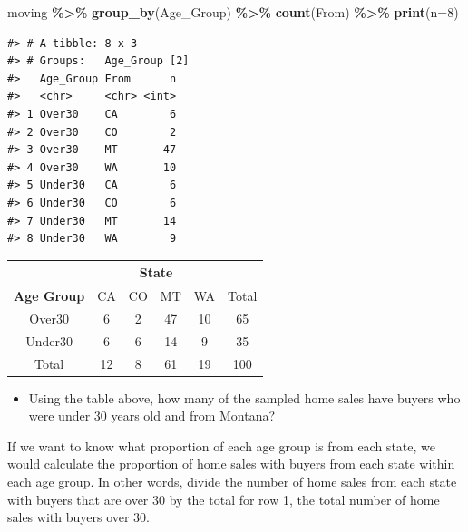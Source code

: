 \documentclass[
]{report}
\newenvironment{Shaded}{\begin{snugshade}}{\end{snugshade}}
\newcommand{\AttributeTok}[1]{\textcolor[rgb]{0.13,0.29,0.53}{#1}}
\newcommand{\DecValTok}[1]{\textcolor[rgb]{0.00,0.00,0.81}{#1}}
\newcommand{\FunctionTok}[1]{\textcolor[rgb]{0.13,0.29,0.53}{\textbf{#1}}}
\newcommand{\NormalTok}[1]{#1}
\newcommand{\SpecialCharTok}[1]{\textcolor[rgb]{0.81,0.36,0.00}{\textbf{#1}}}
\providecommand{\tightlist}{%
  \setlength{\itemsep}{0pt}\setlength{\parskip}{0pt}}
\begin{document}
\begin{Shaded}
\begin{Highlighting}[]
\NormalTok{moving }\SpecialCharTok{\%\textgreater{}\%}
    \FunctionTok{group\_by}\NormalTok{(Age\_Group) }\SpecialCharTok{\%\textgreater{}\%} \FunctionTok{count}\NormalTok{(From) }\SpecialCharTok{\%\textgreater{}\%} \FunctionTok{print}\NormalTok{(}\AttributeTok{n=}\DecValTok{8}\NormalTok{)}
\end{Highlighting}
\end{Shaded}

\begin{verbatim}
#> # A tibble: 8 x 3
#> # Groups:   Age_Group [2]
#>   Age_Group From      n
#>   <chr>     <chr> <int>
#> 1 Over30    CA        6
#> 2 Over30    CO        2
#> 3 Over30    MT       47
#> 4 Over30    WA       10
#> 5 Under30   CA        6
#> 6 Under30   CO        6
#> 7 Under30   MT       14
#> 8 Under30   WA        9
\end{verbatim}

\begin{center}
\begingroup
\setlength{\tabcolsep}{14pt} %
\renewcommand{\arraystretch}{2} %
\begin{tabular}{|c|c|c|c|c|c|}
\hline
 & \multicolumn{4}{|c|}{\textbf{State}} & \\ \hline
\textbf{Age Group} & CA & CO & MT & WA & Total \\ \hline
 Over30 & 6 & 2 & 47 & 10 & 65 \\ \hline
 Under30 & 6 & 6 & 14 & 9 & 35 \\ \hline
 Total & 12 & 8 & 61 & 19 & 100\\ \hline
\end{tabular}
\endgroup
\end{center}

\begin{itemize}
\tightlist
\item
  Using the table above, how many of the sampled home sales have buyers who were under 30 years old and from Montana?
\end{itemize}

\vspace{0.2in}


If we want to know what proportion of each age group is from each state, we would calculate the proportion of home sales with buyers from each state within each age group. In other words, divide the number of home sales from each state with buyers that are over 30 by the total for row 1, the total number of home sales with buyers over 30.
\end{document}
